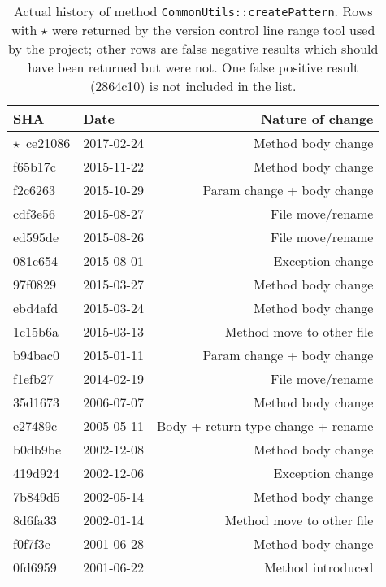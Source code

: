 \begin{table}
	\caption{Actual history of method \texttt{Common\-Utils::\-create\-Pattern}. Rows with $\star$ were returned by the version control line range tool used by the project; other rows are false negative results which should have been returned but were not. One false positive result (2864c10) is not included in the list.}
	\label{tbl:motivation:actual_history}

	\begin{tabular}{ l l r }
		\toprule
		\textbf{SHA} & \textbf{Date} & \textbf{Nature of change} \\
		\midrule
		$\star$~ce21086 & 2017-02-24 & Method body change \\
		f65b17c & 2015-11-22 & Method body change \\
		f2c6263 & 2015-10-29 & Param change + body change  \\
		cdf3e56 & 2015-08-27 & File move/rename  \\
		ed595de & 2015-08-26 & File move/rename  \\
		081c654 & 2015-08-01 & Exception change  \\
		97f0829 & 2015-03-27 & Method body change  \\
		ebd4afd & 2015-03-24 & Method body change  \\
		1c15b6a & 2015-03-13 & Method move to other file  \\
		b94bac0 & 2015-01-11 & Param change + body change \\
		f1efb27 & 2014-02-19 & File move/rename \\
		35d1673 & 2006-07-07 & Method body change \\
		e27489c & 2005-05-11 & Body + return type change + rename \\
		b0db9be & 2002-12-08 & Method body change \\
		419d924 & 2002-12-06 & Exception change \\
		7b849d5 & 2002-05-14 & Method body change \\
		8d6fa33 & 2002-01-14 & Method move to other file \\
		f0f7f3e & 2001-06-28 & Method body change \\
		0fd6959 & 2001-06-22 & Method introduced \\
		\bottomrule
	\end{tabular}
\end{table}

